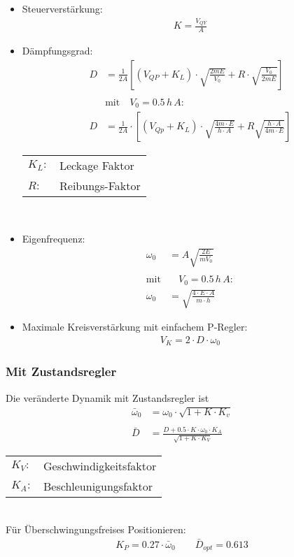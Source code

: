 \begin{itemize}
\item Steuerverstärkung:
\begin{align*}
K = \frac{V_{QY}}{A}
\end{align*}
\item Dämpfungsgrad:
\begin{align*}
D &= \frac{1}{2 A} \left[ (V_{QP} + K_L ) \cdot \sqrt{\frac{2 m E}{V_0}} + R \cdot \sqrt{\frac{V_0}{2 m E}} \right] \\
\\
&\text{mit}\quad V_0 = 0.5 \,  h \, A: \\
D &= \frac{1}{2 A} \cdot \left[ (V_{Qp} + K_L) \cdot \sqrt{\frac{4  m \cdot E}{h \cdot A}} + R \sqrt{ \frac{h \cdot A}{4  m \cdot E}} \right]
\end{align*}
\begin{tabular}{ll}
$K_L:$ & Leckage Faktor \\
$R:$ & Reibungs-Faktor
\end{tabular} \\

\item Eigenfrequenz:
\begin{align*}
\omega_0 &= A \sqrt{\frac{2 E}{m V_0}} \\
\\
\text{mit} & \quad V_0 = 0.5 \, h \, A: \\
\omega_0 &= \sqrt{ \frac{4 \cdot E \cdot A}{m \cdot h} } 
\end{align*}
\item Maximale Kreisverstärkung mit einfachem P-Regler:
\begin{align*}
V_K = 2 \cdot D \cdot \omega_0 
\end{align*}
\end{itemize}


\subsubsection{Mit Zustandsregler}
Die veränderte Dynamik mit Zustandsregler ist
\begin{align*}
\bar{\omega}_0 &= \omega_0 \cdot \sqrt{1 + K \cdot K_v} \\
\\
\bar{D} &= \frac{D + 0.5\cdot K \cdot \omega_0 \cdot K_A}{\sqrt{1+K\cdot K_V}}
\end{align*}

\begin{tabular}{ll}
$K_V:$ & Geschwindigkeitsfaktor \\
$K_A:$ & Beschleunigungsfaktor
\end{tabular}\\

Für Überschwingungsfreises Positionieren:
\begin{align*}
K_P = 0.27 \cdot \bar{\omega}_0 \qquad \bar{D}_{opt} = 0.613
\end{align*}
